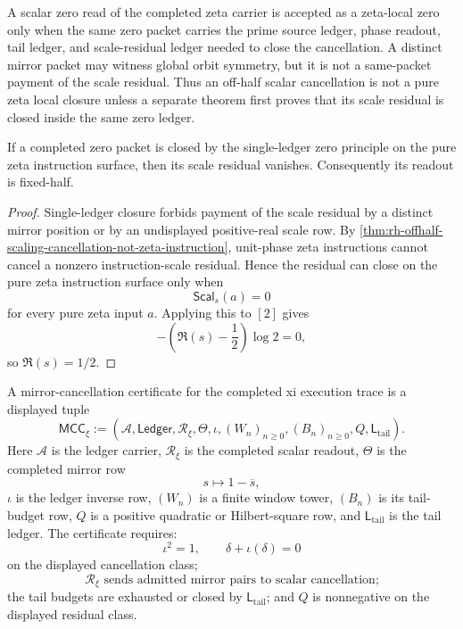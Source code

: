 \begin{principle}
\label{prin:rh-single-ledger-zero-principle}
A scalar zero read of the completed zeta carrier is accepted as a
zeta-local zero only when the same zero packet carries the prime source
ledger, phase readout, tail ledger, and scale-residual ledger needed to
close the cancellation.  A distinct mirror packet may witness global
orbit symmetry, but it is not a same-packet payment of the scale residual.
Thus an off-half scalar cancellation is not a pure zeta local closure
unless a separate theorem first proves that its scale residual is closed
inside the same zero ledger.
\end{principle}

\begin{theorem}
\label{thm:rh-single-ledger-zeta-closure-excludes-offhalf-scale}
If a completed zero packet is closed by the single-ledger zero principle
on the pure zeta instruction surface, then its scale residual vanishes.
Consequently its readout is fixed-half.
\end{theorem}

\begin{proof}
Single-ledger closure forbids payment of the scale residual by a distinct
mirror position or by an undisplayed positive-real scale row.  By
\autoref{thm:rh-offhalf-scaling-cancellation-not-zeta-instruction},
unit-phase zeta instructions cannot cancel a nonzero instruction-scale
residual.  Hence the residual can close on the pure zeta instruction
surface only when
$$
\mathsf{Scal}_s(a)=0
$$
for every pure zeta input $a$.  Applying this to $[2]$ gives
$$
-\left(\Re(s)-\frac12\right)\log2=0,
$$
so $\Re(s)=1/2$.
\end{proof}

\begin{definition}
\label{def:rh-mirror-cancellation-certificate}
A mirror-cancellation certificate for the completed xi execution trace
is a displayed tuple
$$
\mathsf{MCC}_{\xi}
:=
(\mathcal A,\mathsf{Ledger},\mathcal R_{\xi},\Theta,\iota,
(W_n)_{n\ge0},(B_n)_{n\ge0},Q,\mathsf L_{\mathrm{tail}}).
$$
Here $\mathcal A$ is the ledger carrier, $\mathcal R_{\xi}$ is the
completed scalar readout, $\Theta$ is the completed mirror row
$$
s\mapsto 1-\overline{s},
$$
$\iota$ is the ledger inverse row, $(W_n)$ is a finite window tower,
$(B_n)$ is its tail-budget row, $Q$ is a positive quadratic or
Hilbert-square row, and $\mathsf L_{\mathrm{tail}}$ is the tail ledger.
The certificate requires:
$$
\iota^2=1,
\qquad
\delta+\iota(\delta)=0
$$
on the displayed cancellation class;
$$
\mathcal R_{\xi}
\text{ sends admitted mirror pairs to scalar cancellation;}
$$
the tail budgets are exhausted or closed by
$\mathsf L_{\mathrm{tail}}$; and $Q$ is nonnegative on the displayed
residual class.
\end{definition}

